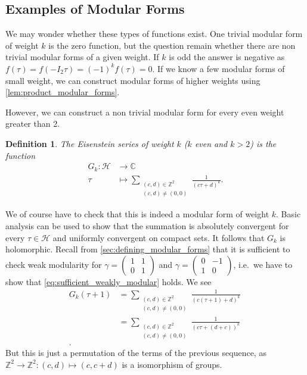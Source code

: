 \documentclass[titlepage,a4paper]{article}
\theoremstyle{theoremdd}
\theoremstyle{definitiondd}
\newtheorem{definition}[theorem]{Definition}
\theoremstyle{remarkdd}
\newcommand{\Z}{\mathbb{Z}}
\newcommand{\C}{\mathbb{C}}
\begin{document}
\subsection{Examples of Modular Forms}
We may wonder whether these types of functions exist. One trivial modular form of weight $k$ is the zero function, but the question remain whether there are non trivial modular forms of a given weight.
If $k$ is odd the answer is negative as $f(\tau) = f(-I_2 \tau) = (-1)^{k} f(\tau) = 0$. 
If we know a few modular forms of small weight, we can construct modular forms of higher weights using \cref{lem:product_modular_forms}.

However, we can construct a non trivial modular form for every even weight greater than 2.
\begin{definition}
	The \emph{Eisenstein series of weight $k$} ($k$ even and  $k >2$) is the function
	\begin{align*}
		G_k: \mathcal{H} &\longrightarrow \C \\
		\tau &\longmapsto \sum_{\substack{(c,d) \in \Z^2 \\ (c,d)\ne (0,0) }} \frac{1}{(c\tau + d)^{k}}
	.\end{align*}
\end{definition}
We of course have to check that this is indeed a modular form of weight $k$. 
Basic analysis can be used to show that the summation is absolutely convergent for every  $\tau \in \mathcal{H}$ and uniformly convergent on compact sets.
It follows that $G_k$ is holomorphic.
Recall from \cref{sec:defining_modular_forms} that it is sufficient to check weak modularity for  $\gamma = \begin{pmatrix} 1 & 1 \\ 0 & 1 \end{pmatrix} $ and $\gamma = \begin{pmatrix} 0 & -1 \\ 1 & 0  \end{pmatrix} $, i.e.\ we have to show that \cref{eq:sufficient_weakly_modular} holds.
We see 
\begin{align*}
	G_k(\tau + 1) &= \sum_{\substack{(c, d) \in \Z^2 \\ (c, d) \ne (0,0)}} \frac{1}{(c (\tau + 1) + d)^{k}}\\
			 &= \sum_{\substack{(c, d) \in \Z^2 \\ (c, d) \ne (0,0)}} \frac{1}{(c \tau + (d+c))^{k}}\ \\
.\end{align*}
But this is just a permutation of the terms of the previous sequence, as $\Z^2 \to \Z^2: (c,d) \mapsto (c, c+ d)$ is a isomorphism of groups.
\end{document}
